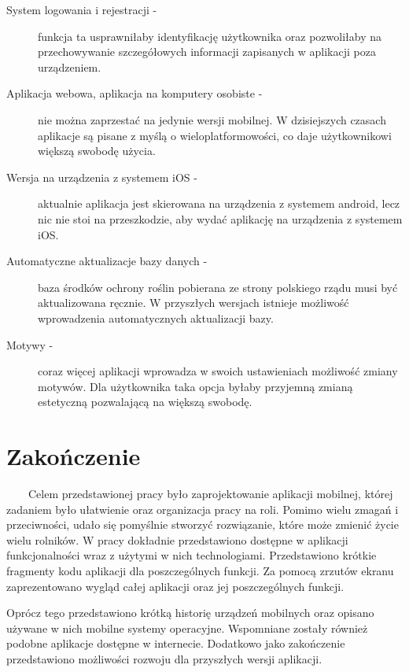 \documentclass[a4paper,12pt,oneside]{book}
\begin{document}
	\begin{description}
		\item[System logowania i rejestracji -] funkcja ta usprawniłaby identyfikację użytkownika oraz pozwoliłaby na przechowywanie szczegółowych informacji zapisanych w aplikacji poza urządzeniem.
		\item[Aplikacja webowa, aplikacja na komputery osobiste -] nie można zaprzestać na jedynie wersji mobilnej. W dzisiejszych czasach aplikacje są pisane z myślą o wieloplatformowości, co daje użytkownikowi większą swobodę użycia.
		\item[Wersja na urządzenia z systemem iOS -] aktualnie aplikacja jest skierowana na urządzenia z systemem android, lecz nic nie stoi na przeszkodzie, aby wydać aplikację na urządzenia z systemem iOS.
		\item[Automatyczne aktualizacje bazy danych -] baza środków ochrony roślin pobierana ze strony polskiego rządu musi być aktualizowana ręcznie. W przyszłych wersjach istnieje możliwość wprowadzenia automatycznych aktualizacji bazy.
		\item[Motywy -] coraz więcej aplikacji wprowadza w swoich ustawieniach możliwość zmiany motywów. Dla użytkownika taka opcja byłaby przyjemną zmianą estetyczną pozwalającą na większą swobodę.
	\end{description}
	
	
	\section{Zakończenie}
	\ \ \ \
	Celem przedstawionej pracy było zaprojektowanie aplikacji mobilnej, której zadaniem było ułatwienie oraz organizacja pracy na roli. Pomimo wielu zmagań i przeciwności, udało się pomyślnie stworzyć rozwiązanie, które może zmienić życie wielu rolników. W pracy dokładnie przedstawiono dostępne w aplikacji funkcjonalności wraz z użytymi w nich technologiami. Przedstawiono krótkie fragmenty kodu aplikacji dla poszczególnych funkcji. Za pomocą zrzutów ekranu zaprezentowano wygląd całej aplikacji oraz jej poszczególnych funkcji. 
	
	Oprócz tego przedstawiono krótką historię urządzeń mobilnych oraz opisano używane w nich mobilne systemy operacyjne. Wspomniane zostały również podobne aplikacje dostępne w internecie. Dodatkowo jako zakończenie przedstawiono możliwości rozwoju dla przyszłych wersji aplikacji.
	
	\newpage
	
	
	
	
	\renewcommand\lstlistlistingname{Spis kodów źródłowych}
	\lstlistoflistings
	
	\listoffigures
	
\end{document}
